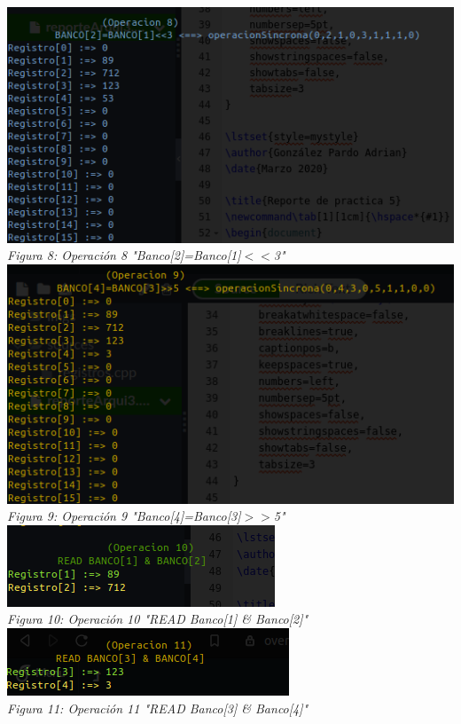 \documentclass[12pt,executivepaper]{article}
\begin{document}
\begin{center}
    \includegraphics[scale=0.85]{imgs/nueve.png}\\
    \textit{Figura 8: Operación 8 "Banco[2]=Banco[1]$<<$3"}\\
    \includegraphics[scale=0.9]{imgs/diez.png}\\
    \textit{Figura 9: Operación 9 "Banco[4]=Banco[3]$>>$5"}\\

    \includegraphics[scale=1]{imgs/once.png}\\
    \textit{Figura 10: Operación 10 "READ Banco[1] \& Banco[2]"}\\
    \includegraphics[scale=1]{imgs/doce.png}\\
    \textit{Figura 11: Operación 11 "READ Banco[3] \& Banco[4]"}\\


\end{center}
\end{document}
